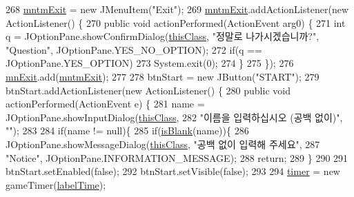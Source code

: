 \begin{DoxyCode}
268         \hyperlink{classpkg_1_1main_frame_ab5c36db42de946a49e1955e4e6bdfd6b}{mntmExit} = \textcolor{keyword}{new} JMenuItem(\textcolor{stringliteral}{"Exit"});
269         \hyperlink{classpkg_1_1main_frame_ab5c36db42de946a49e1955e4e6bdfd6b}{mntmExit}.addActionListener(\textcolor{keyword}{new} ActionListener() \{
270             \textcolor{keyword}{public} \textcolor{keywordtype}{void} actionPerformed(ActionEvent arg0) \{
271                 \textcolor{keywordtype}{int} q = JOptionPane.showConfirmDialog(\hyperlink{classpkg_1_1main_frame_aa7857342de44fb7ddfa5d6e2685f71fb}{thisClass}, \textcolor{stringliteral}{"정말로 나가시겠습니까?"}, \textcolor{stringliteral}{"Question"}, 
      JOptionPane.YES\_NO\_OPTION);
272                 \textcolor{keywordflow}{if}(q == JOptionPane.YES\_OPTION)
273                     System.exit(0);
274             \}
275         \});
276         \hyperlink{classpkg_1_1main_frame_ae8893bf8bbe88ef0095ae7aa423e2b23}{mnExit}.add(\hyperlink{classpkg_1_1main_frame_ab5c36db42de946a49e1955e4e6bdfd6b}{mntmExit});
277         
278         btnStart = \textcolor{keyword}{new} JButton(\textcolor{stringliteral}{"START"});
279         btnStart.addActionListener(\textcolor{keyword}{new} ActionListener() \{
280             \textcolor{keyword}{public} \textcolor{keywordtype}{void} actionPerformed(ActionEvent e) \{
281                 name = JOptionPane.showInputDialog(\hyperlink{classpkg_1_1main_frame_aa7857342de44fb7ddfa5d6e2685f71fb}{thisClass},
282                         \textcolor{stringliteral}{"이름을 입력하십시오 (공백 없이)"}, \textcolor{stringliteral}{""});
283                 
284                 \textcolor{keywordflow}{if}(name != null)\{
285                     \textcolor{keywordflow}{if}(\hyperlink{classpkg_1_1main_frame_af58a9fa8a1605e5af98f91662963715b}{isBlank}(name))\{
286                         JOptionPane.showMessageDialog(\hyperlink{classpkg_1_1main_frame_aa7857342de44fb7ddfa5d6e2685f71fb}{thisClass}, \textcolor{stringliteral}{"공백 없이 입력해 주세요"},
287                                 \textcolor{stringliteral}{"Notice"}, JOptionPane.INFORMATION\_MESSAGE);
288                         \textcolor{keywordflow}{return};
289                     \}
290                     
291                     btnStart.setEnabled(\textcolor{keyword}{false});
292                     btnStart.setVisible(\textcolor{keyword}{false});
293                 
294                     \hyperlink{classpkg_1_1main_frame_aa204a940456c1c064259cafdd59434a6}{timer} = \textcolor{keyword}{new} gameTimer(\hyperlink{classpkg_1_1main_frame_abd8e5f522ea7312634baf06ed61d5206}{labelTime});

\end{DoxyCode}

